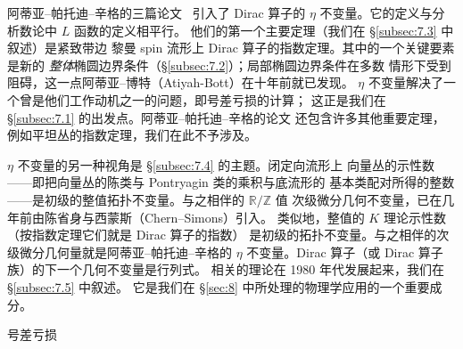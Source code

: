 \documentclass[11pt]{amsart}
\makeatletter
\def\subsection{\@startsection{subsection}{2}%
   \z@{1.25\linespacing\@plus.7\linespacing}{.5\linespacing}%
   {\normalfont\bfseries}}
\theoremstyle{definition}
\theoremstyle{remark}
\theoremstyle{plain}
\numberwithin{equation}{section}
\renewcommand{\:}{\colon}
\newcommand{\RR}{{\mathbb R}}
\newcommand{\ZZ}{{\mathbb Z}}
\newcommand{\RZ}{\RR/\ZZ}
\makeatother
\begin{document}
阿蒂亚–帕托迪–辛格的三篇论文~\cite{APS1,APS2,APS3} 引入了
Dirac 算子的 $\eta$ 不变量。它的定义与分析数论中 $L$ 函数的定义相平行。
他们的第一个主要定理（我们在 \S\ref{subsec:7.3} 中叙述）是紧致带边
黎曼 spin 流形上 Dirac 算子的指数定理。其中的一个关键要素是新的
\emph{整体}椭圆边界条件（\S\ref{subsec:7.2}）；局部椭圆边界条件在多数
情形下受到阻碍，这一点阿蒂亚–博特（Atiyah-Bott）在十年前就已发现。
$\eta$ 不变量解决了一个曾是他们工作动机之一的问题，即号差亏损的计算；
这正是我们在 \S\ref{subsec:7.1} 的出发点。阿蒂亚–帕托迪–辛格的论文
还包含许多其他重要定理，例如平坦丛的指数定理，我们在此不予涉及。

$\eta$ 不变量的另一种视角是 \S\ref{subsec:7.4} 的主题。闭定向流形上
向量丛的示性数——即把向量丛的陈类与 Pontryagin 类的乘积与底流形的
基本类配对所得的整数——是初级的整值拓扑不变量。与之相伴的 $\RZ$ 值
次级微分几何不变量，已在几年前由陈省身与西蒙斯（Chern–Simons）引入。
类似地，整值的 $K$ 理论示性数（按指数定理它们就是 Dirac 算子的指数）
是初级的拓扑不变量。与之相伴的次级微分几何量就是阿蒂亚–帕托迪–辛格的
$\eta$ 不变量。Dirac 算子（或 Dirac 算子族）的下一个几何不变量是行列式。
相关的理论在 1980 年代发展起来，我们在 \S\ref{subsec:7.5} 中叙述。
它是我们在 \S\ref{sec:8} 中所处理的物理学应用的一个重要成分。



  \subsection{号差亏损}\label{subsec:7.1}
\end{document}
